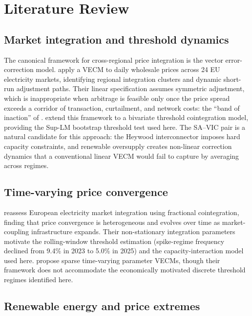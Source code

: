 \documentclass[12pt,a4paper]{article}
\begin{document}
\section{Literature Review}
\label{sec:lit}

\subsection*{Market integration and threshold dynamics}

The canonical framework for cross-regional price integration is the vector
error-correction model.  \textcite{stanciu2025price} apply a VECM to daily
wholesale prices across 24 EU electricity markets, identifying regional
integration clusters and dynamic short-run adjustment paths.  Their linear specification assumes symmetric adjustment, which is inappropriate
when arbitrage is feasible only once the price spread exceeds a corridor of
transaction, curtailment, and network costs: the ``band of inaction''
of \textcite{balke1997threshold}.  \textcite{hansen2002testing} extend this
framework to a bivariate threshold cointegration model, providing the Sup-LM
bootstrap threshold test used here.  The SA--VIC pair is a natural candidate
for this approach: the Heywood interconnector imposes hard capacity constraints,
and renewable oversupply creates non-linear correction dynamics that a
conventional linear VECM would fail to capture by averaging across regimes.

\subsection*{Time-varying price convergence}

\textcite{demenezes2016reassessing} reassess European electricity market
integration using fractional cointegration, finding that price convergence is
heterogeneous and evolves over time as market-coupling infrastructure expands.
Their non-stationary integration parameters motivate the rolling-window
threshold estimation (spike-regime frequency declined from 9.4\% in 2023 to
5.0\% in 2025) and the capacity-interaction model used here.
\textcite{hauzenberger2023sparse} propose sparse time-varying parameter VECMs,
though their framework does not accommodate the economically motivated
discrete threshold regimes identified here.

\subsection*{Renewable energy and price extremes}
\end{document}
